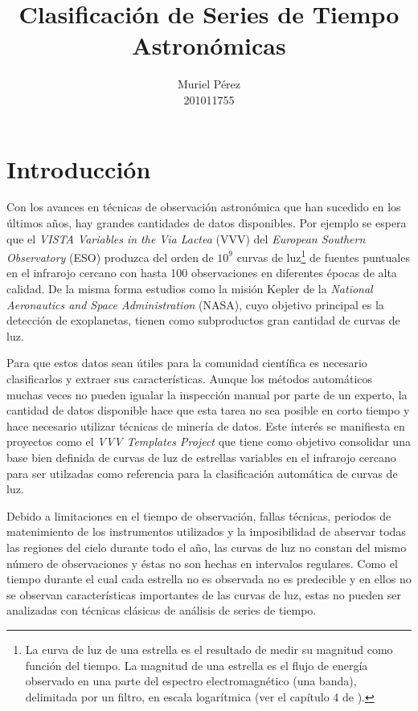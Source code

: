 \documentclass[letterpaper,12pt]{book}
\title{Clasificación de Series de Tiempo Astronómicas}
\author{Muriel Pérez\\ 201011755}
\begin{document}
\maketitle
\tableofcontents 
\chapter{Introducción}

Con los avances en técnicas de observación astronómica que han sucedido en los últimos años, hay grandes cantidades de datos disponibles. Por ejemplo se espera que el \textit{VISTA Variables in the Via Lactea} (VVV) del \textit{European Southern Observatory} (ESO) produzca del orden de $10^{9}$ curvas de luz\footnote{\label{nota:curvasDeLuz} La curva de luz de una estrella es el resultado de medir su magnitud como función del tiempo. La magnitud de una estrella es el flujo de energía observado en una parte del espectro electromagnético (una banda), delimitada por un filtro, en escala logarítmica (ver el capítulo 4 de \cite{karttunen_fundamental_2007}).} de fuentes puntuales en el infrarojo cercano con hasta 100 observaciones en diferentes épocas de alta calidad. De la misma forma estudios como la misión Kepler de la \textit{National Aeronautics and Space Administration} (NASA), cuyo objetivo principal es la detección de exoplanetas,  tienen como subproductos gran cantidad de curvas  de luz. 

Para que estos datos sean útiles para la comunidad científica es necesario clasificarlos y extraer sus características. Aunque los métodos automáticos muchas veces no pueden igualar la inspección manual por parte de un experto, la cantidad de datos disponible hace que esta tarea no sea posible en corto tiempo y hace necesario utilizar técnicas de minería de datos. Este interés se manifiesta en proyectos como el \textit{VVV Templates Project} que tiene como objetivo consolidar una base bien definida de curvas de luz de estrellas variables en el infrarojo cercano para ser utilzadas como referencia para la clasificación automática de curvas de luz.

Debido a limitaciones en el tiempo de observación, fallas técnicas, periodos de matenimiento de los instrumentos utilizados y la imposibilidad de abservar todas las regiones del cielo durante todo el año, las curvas de luz no constan del mismo número de observaciones y éstas no son hechas en intervalos regulares. Como el tiempo durante el cual cada estrella no es observada no es predecible y en ellos no se observan características importantes de las curvas de luz,  estas no pueden ser analizadas con técnicas clásicas de análisis de series de tiempo.
\end{document}

